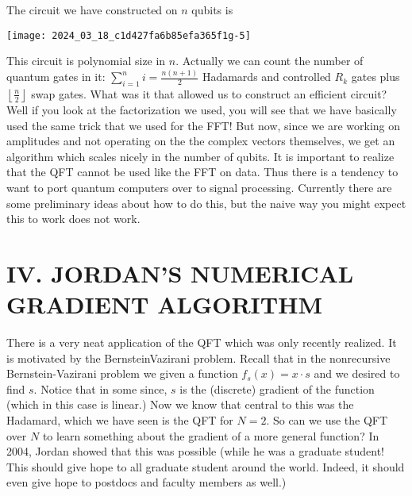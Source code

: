 \documentclass[10pt]{article}
\begin{document}
The circuit we have constructed on $n$ qubits is

\begin{center}
\texttt{[image: 2024\_03\_18\_c1d427fa6b85efa365f1g-5]}
\end{center}

This circuit is polynomial size in $n$. Actually we can count the number of quantum gates in it: $\sum_{i=1}^{n} i=\frac{n(n+1)}{2}$ Hadamards and controlled $R_{k}$ gates plus $\left\lfloor\frac{n}{2}\right\rfloor$ swap gates. What was it that allowed us to construct an efficient circuit? Well if you look at the factorization we used, you will see that we have basically used the same trick that we used for the FFT! But now, since we are working on amplitudes and not operating on the the complex vectors themselves, we get an algorithm which scales nicely in the number of qubits. It is important to realize that the QFT cannot be used like the FFT on data. Thus there is a tendency to want to port quantum computers over to signal processing. Currently there are some preliminary ideas about how to do this, but the naive way you might expect this to work does not work.

\section*{IV. JORDAN'S NUMERICAL GRADIENT ALGORITHM}
There is a very neat application of the QFT which was only recently realized. It is motivated by the BernsteinVazirani problem. Recall that in the nonrecursive Bernstein-Vazirani problem we given a function $f_{s}(x)=x \cdot s$ and we desired to find $s$. Notice that in some since, $s$ is the (discrete) gradient of the function (which in this case is linear.) Now we know that central to this was the Hadamard, which we have seen is the QFT for $N=2$. So can we use the QFT over $N$ to learn something about the gradient of a more general function? In 2004, Jordan showed that this was possible (while he was a graduate student! This should give hope to all graduate student around the world. Indeed, it should even give hope to postdocs and faculty members as well.)
\end{document}
